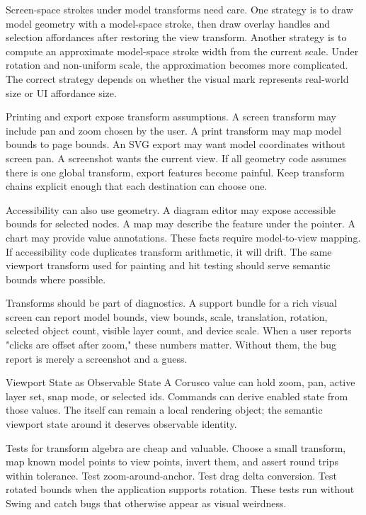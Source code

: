 Screen-space strokes under model transforms need care. One strategy is to draw model geometry with a model-space stroke, then draw overlay handles and selection affordances after restoring the view transform. Another strategy is to compute an approximate model-space stroke width from the current scale. Under rotation and non-uniform scale, the approximation becomes more complicated. The correct strategy depends on whether the visual mark represents real-world size or UI affordance size.

Printing and export expose transform assumptions. A screen transform may include pan and zoom chosen by the user. A print transform may map model bounds to page bounds. An SVG export may want model coordinates without screen pan. A screenshot wants the current view. If all geometry code assumes there is one global transform, export features become painful. Keep transform chains explicit enough that each destination can choose one.

Accessibility can also use geometry. A diagram editor may expose accessible bounds for selected nodes. A map may describe the feature under the pointer. A chart may provide value annotations. These facts require model-to-view mapping. If accessibility code duplicates transform arithmetic, it will drift. The same viewport transform used for painting and hit testing should serve semantic bounds where possible.

Transforms should be part of diagnostics. A support bundle for a rich visual screen can report model bounds, view bounds, scale, translation, rotation, selected object count, visible layer count, and device scale. When a user reports "clicks are offset after zoom," these numbers matter. Without them, the bug report is merely a screenshot and a guess.

\begin{coruscobox}{Viewport State as Observable State}
A Corusco value can hold zoom, pan, active layer set, snap mode, or selected ids. Commands can derive enabled state from those values. The  itself can remain a local rendering object; the semantic viewport state around it deserves observable identity.
\end{coruscobox}

Tests for transform algebra are cheap and valuable. Choose a small transform, map known model points to view points, invert them, and assert round trips within tolerance. Test zoom-around-anchor. Test drag delta conversion. Test rotated bounds when the application supports rotation. These tests run without Swing and catch bugs that otherwise appear as visual weirdness.

